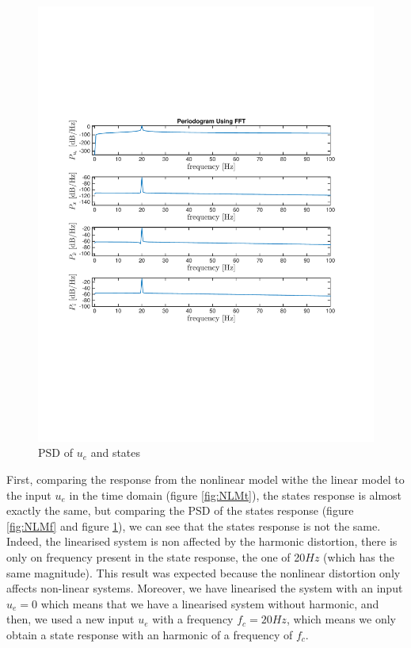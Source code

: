 \begin{figure}[H]
 \centering 
\includegraphics[trim=2cm 7cm 2cm 7cm, clip=true, totalheight=0.35\textheight, angle=0]{figures/responseLMf2.pdf}
\caption{PSD of $u_e$ and states}
\label{fig:responseLMf}
\end{figure}

First, comparing the response from the nonlinear model withe the linear model to the input $u_e$ in the time domain (figure \ref{fig:NLMt}), the states response is almost exactly the same, but comparing the PSD of the states response (figure \ref{fig:NLMf} and figure \ref{fig:responseLMf}), we can see that the states response is not the same. Indeed, the linearised system is non affected by the harmonic distortion, there is only on frequency present in the state response, the one of 20$Hz$ (which has the same magnitude).
This result was expected because the nonlinear distortion only affects non-linear systems. Moreover, we have linearised the system with an input $u_e=0$ which means that we have a linearised system without harmonic, and then, we used a new input $u_e$ with a frequency $f_c=20Hz$, which means we only obtain a state response with an harmonic of a frequency of $f_c$.





